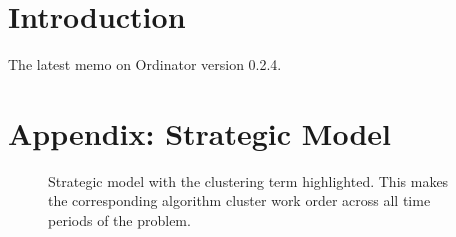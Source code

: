 \documentclass[11pt]{article}
\begin{document}
	
	\section{Introduction}
	The latest memo on Ordinator version 0.2.4.
	

	\newpage
	\section{Appendix: Strategic Model}\label{sec:strategic-model}
	\begin{figure}
		\strategicModel[clustering=true, beta=false, multiskill=true]
		\caption{Strategic model with the clustering term highlighted. This makes the
			corresponding algorithm cluster work order across all time periods of the problem.
		}
	\end{figure}
	
\end{document}
